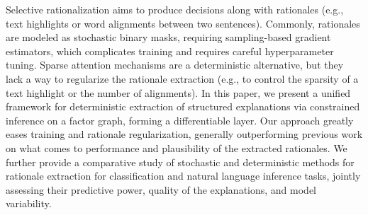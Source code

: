 Selective rationalization aims to produce decisions along with rationales (e.g., text highlights or word alignments between two sentences). Commonly, rationales are modeled as stochastic binary masks, requiring sampling-based gradient estimators, which complicates training and requires careful hyperparameter tuning. Sparse attention mechanisms are a deterministic alternative, but they lack a way to regularize the rationale extraction (e.g., to control the sparsity of a text highlight or the number of alignments). In this paper, we present a unified framework for deterministic extraction of structured explanations via constrained inference on a factor graph, forming a differentiable layer. Our approach greatly eases training and rationale regularization, generally outperforming previous work on what comes to performance and plausibility of the extracted rationales. We further provide a comparative study of stochastic and deterministic methods for rationale extraction for classification and natural language inference tasks, jointly assessing their predictive power, quality of the explanations, and model variability.
